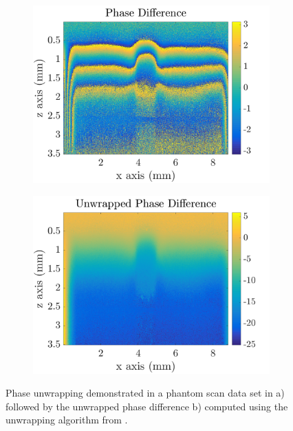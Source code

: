 \begin{figure}[t]
	\centering
	\begin{subfigure}{0.49\textwidth}
		\centering
		\includegraphics[width=\textwidth]{bground_figs/phase_difference.png}
	\end{subfigure}
	\begin{subfigure}{0.49\textwidth}
		\centering
		\includegraphics[width=\textwidth]{bground_figs/unwrapped_phase.png}
	\end{subfigure}
	\caption{Phase unwrapping demonstrated in a phantom scan data set in a) followed by the unwrapped phase difference b) computed using the unwrapping algorithm from \cite{kennedy_optical_2014}.}
	\label{phase_wrapping}	
\end{figure}

